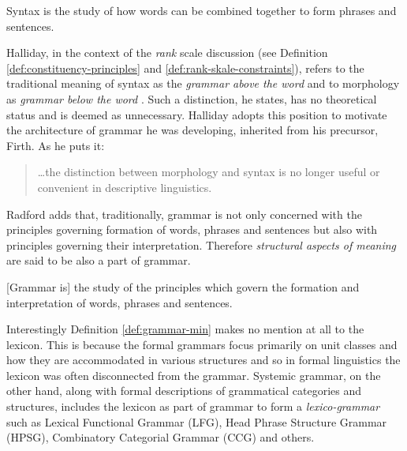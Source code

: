 \begin{definition}\label{def:syntax-min}
Syntax is the study of how words can be combined together to form phrases and sentences. \citep[1]{Radford1997}
\end{definition}

Halliday, in the context of the \textit{rank} scale discussion (see Definition \ref{def:constituency-principles} and \ref{def:rank-skale-constraints}), refers to the traditional meaning of syntax as the \textit{grammar above the word} and to morphology as \textit{grammar below the word} \citep[ 51]{Halliday2002}. Such a distinction, he states, has no theoretical status and is deemed as unnecessary. Halliday adopts this position to motivate the architecture of grammar he was developing, inherited from his precursor, Firth. As he puts it: 
\begin{quote}
	\dots the distinction between morphology and syntax is no longer useful or convenient in descriptive linguistics. \citep[14]{Firth1957}
\end{quote}


Radford adds that, traditionally, grammar is not only concerned with the principles governing formation of words, phrases and sentences but also with principles governing their interpretation. Therefore \textit{structural aspects of meaning} are said to be also a part of grammar. 

\begin{definition}\label{def:grammar-min}
[Grammar is] the study of the principles which govern the formation and interpretation of words, phrases and sentences. \citep[1]{Radford1997}
\end{definition}

Interestingly Definition \ref{def:grammar-min} makes no mention at all to the lexicon. This is because the formal grammars focus primarily on unit classes and how they are accommodated in various structures and so in formal linguistics the lexicon was often disconnected from the grammar. Systemic grammar, on the other hand, along with formal descriptions of grammatical categories and structures, includes the lexicon as part of grammar to form a \textit{lexico-grammar} such as
Lexical Functional Grammar (LFG), Head Phrase Structure Grammar (HPSG), Combinatory Categorial Grammar (CCG) and others. 

